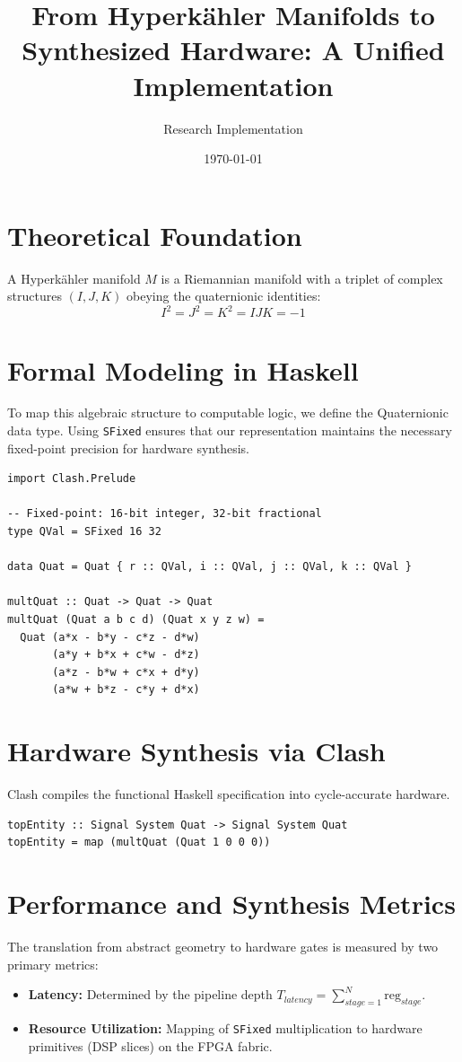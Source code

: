 \documentclass{article}
\title{From Hyperkähler Manifolds to Synthesized Hardware: A Unified Implementation}
\author{Research Implementation}
\date{\today}
\begin{document}
\maketitle

\section{Theoretical Foundation}
A Hyperkähler manifold $M$ is a Riemannian manifold with a triplet of complex structures $(I, J, K)$ obeying the quaternionic identities:
\begin{equation}
    I^2 = J^2 = K^2 = IJK = -1
\end{equation}


\section{Formal Modeling in Haskell}
To map this algebraic structure to computable logic, we define the Quaternionic data type. Using \texttt{SFixed} ensures that our representation maintains the necessary fixed-point precision for hardware synthesis.

\begin{lstlisting}
import Clash.Prelude

-- Fixed-point: 16-bit integer, 32-bit fractional
type QVal = SFixed 16 32

data Quat = Quat { r :: QVal, i :: QVal, j :: QVal, k :: QVal }

multQuat :: Quat -> Quat -> Quat
multQuat (Quat a b c d) (Quat x y z w) = 
  Quat (a*x - b*y - c*z - d*w)
       (a*y + b*x + c*w - d*z)
       (a*z - b*w + c*x + d*y)
       (a*w + b*z - c*y + d*x)
\end{lstlisting}

\section{Hardware Synthesis via Clash}
Clash compiles the functional Haskell specification into cycle-accurate hardware.


\begin{lstlisting}
topEntity :: Signal System Quat -> Signal System Quat
topEntity = map (multQuat (Quat 1 0 0 0))
\end{lstlisting}

\section{Performance and Synthesis Metrics}
The translation from abstract geometry to hardware gates is measured by two primary metrics:
\begin{itemize}
    \item \textbf{Latency:} Determined by the pipeline depth $T_{latency} = \sum_{stage=1}^{N} \text{reg}_{stage}$.
    \item \textbf{Resource Utilization:} Mapping of \texttt{SFixed} multiplication to hardware primitives (DSP slices) on the FPGA fabric.
\end{itemize}
\end{document}
